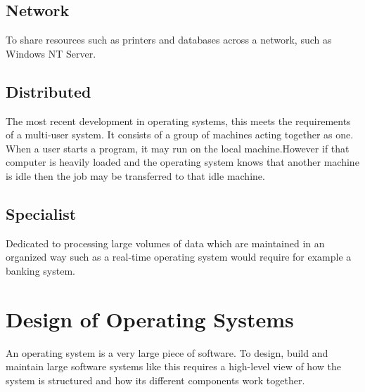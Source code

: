 \subsection{Network}
To share resources such as printers and databases across a network, such as Windows NT Server.

\subsection{Distributed}
The most recent development in operating systems, this meets the requirements of a multi-user system. It consists of a group of machines acting together as one. When a user starts a program, it may run on the local machine.However if that computer is heavily loaded and the operating system knows that another machine is idle then the job may be transferred to that idle machine.

\subsection{Specialist}
Dedicated to processing large volumes of data which are maintained in an organized way such as a real-time operating system would require for example a banking system. 

\section{Design of Operating Systems}
An operating system is a very large piece of software. To design, build and maintain large software systems like this requires a high-level view of how the system is structured and how its different components work together. 